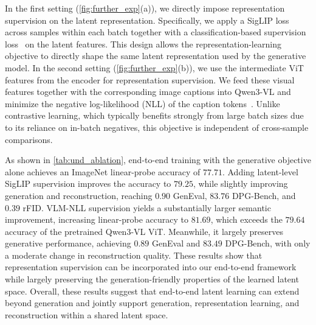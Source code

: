 \documentclass[]{bytedance_seed}
\begin{document}
In the first setting (\cref{fig:further_exp}(a)), we directly impose representation supervision on the latent representation.
Specifically, we apply a SigLIP loss~\cite{zhai2023sigmoid,tschannen2025siglip} across samples within each batch together with a classification-based supervision loss~\cite{huang2024classification} on the latent features.
This design allows the representation-learning objective to directly shape the same latent representation used by the generative model.
In the second setting (\cref{fig:further_exp}(b)), we use the intermediate ViT features from the encoder for representation supervision.
We feed these visual features together with the corresponding image captions into Qwen3-VL and minimize the negative log-likelihood (NLL) of the caption tokens~\cite{tschannen2023image}.
Unlike contrastive learning, which typically benefits strongly from large batch sizes due to its reliance on in-batch negatives, this objective is independent of cross-sample comparisons.

As shown in \cref{tab:und_ablation}, end-to-end training with the generative objective alone achieves an ImageNet linear-probe accuracy of $77.71$.
Adding latent-level SigLIP supervision improves the accuracy to $79.25$, while slightly improving generation and reconstruction, reaching $0.90$ GenEval, $83.76$ DPG-Bench, and $0.39$ rFID.
VLM-NLL supervision yields a substantially larger semantic improvement, increasing linear-probe accuracy to $81.69$, which exceeds the $79.64$ accuracy of the pretrained Qwen3-VL ViT.
Meanwhile, it largely preserves generative performance, achieving $0.89$ GenEval and $83.49$ DPG-Bench, with only a moderate change in reconstruction quality.
These results show that representation supervision can be incorporated into our end-to-end framework while largely preserving the generation-friendly properties of the learned latent space.
Overall, these results suggest that end-to-end latent learning can extend beyond generation and jointly support generation, representation learning, and reconstruction within a shared latent space.
\end{document}
